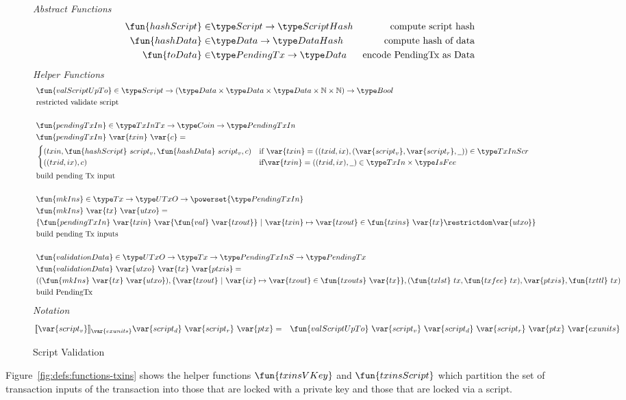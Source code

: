 \begin{figure*}[htb]
  \emph{Abstract Functions}
  \begin{align*}
    \fun{hashScript} \in & \Script\to \HashScr & \text{compute script hash} \\
    \fun{hashData} \in & \Data \to \HashDat
    & \text{compute hash of data} \\
    \fun{toData} \in & \PendingTx\to \Data
    & \text{encode PendingTx as Data} \\
  \end{align*}
  \emph{Helper Functions}
  \begin{align*}
    & \fun{valScriptUpTo} \in \Script\to (\Data \times \Data \times \Data \times \N \times \N)
    \to\Bool \\ & \text{restricted validate script} \\~\\
    & \fun{pendingTxIn} \in \TxInTx \to \Coin \to \PendingTxIn \\
    & \fun{pendingTxIn}~\var{txin}~\var{c} = \\
    & \begin{cases}
          (txin,\fun{hashScript}~{script_v},\fun{hashData}~{script_v},c)
           & \text{if}~\var{txin} = ((txid,ix),(\var{script_v}, \var{script_r},\wcard)) \in \TxInScr \\
          ((txid,ix),c) & \text{if}
           \var{txin} = ((txid,ix),\wcard) \in \TxIn \times \IsFee
      \end{cases}\\
    & \text{build pending Tx input} \\~\\
    & \fun{mkIns} \in \Tx \to \UTxO \to \powerset{\PendingTxIn} \\
    & \fun{mkIns}~\var{tx}~\var{utxo} = \\
    & \{ \fun{pendingTxIn}~\var{txin}~\var{\fun{val}~\var{txout}} ~\vert~ \var{txin} \mapsto \var{txout}
    \in \fun{txins}~\var{tx} \restrictdom \var{utxo}\} \\
    & \text{build pending Tx inputs} \\~\\
    & \fun{validationData} \in \UTxO \to \Tx \to \PendingTxInS \to \PendingTx \\
    & \fun{validationData}~\var{utxo}~\var{tx}~\var{ptxis} = \\ &
    ((\fun{mkIns}~\var{tx}~\var{utxo}),\{ \var{txout}~\vert~ \var{ix} \mapsto \var{txout} \in \fun{txouts}~\var{tx}\}, (\fun{txlst}~{tx},
    \fun{txfee}~{tx}),\var{ptxis},\fun{txttl}~{tx}) \\
    & \text{build PendingTx} \\
  \end{align*}
  \emph{Notation}
  \begin{align*}
    \llbracket \var{script_v} \rrbracket_{\var{exunits}} \var{script_d}~\var{script_r}~\var{ptx}
    &=& \fun{valScriptUpTo} ~\var{script_v} ~ \var{script_d}~\var{script_r}~\var{ptx}~
    \var{exunits}
  \end{align*}
  \caption{Script Validation}
  \label{fig:defs:functions-valid}
\end{figure*}

Figure~\ref{fig:defs:functions-txins} shows the helper functions
$\fun{txinsVKey}$ and $\fun{txinsScript}$ which partition the set of transaction
inputs of the transaction into those that are locked with a private key and
those that are locked via a script.

\clearpage

